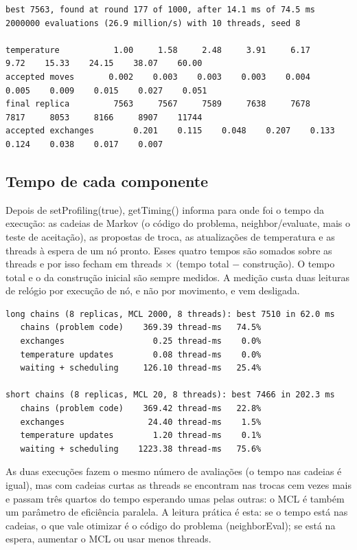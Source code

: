 \documentclass[10pt,a4paper]{article}
\newcommand{\code}[1]{{\ttfamily #1}}
\begin{document}
\begin{lstlisting}[style=saida]
best 7563, found at round 177 of 1000, after 14.1 ms of 74.5 ms
2000000 evaluations (26.9 million/s) with 10 threads, seed 8

temperature           1.00     1.58     2.48     3.91     6.17     9.72    15.33    24.15    38.07    60.00
accepted moves       0.002    0.003    0.003    0.003    0.004    0.005    0.009    0.015    0.027    0.051
final replica         7563     7567     7589     7638     7678     7817     8053     8166     8907    11744
accepted exchanges        0.201    0.115    0.048    0.207    0.133    0.124    0.038    0.017    0.007
\end{lstlisting}

\subsection{Tempo de cada componente}

Depois de \code{setProfiling(true)}, \code{getTiming()} informa para onde foi o tempo da execução: as cadeias de Markov (o código do problema, \code{neighbor}/\code{evaluate}, mais o teste de aceitação), as propostas de troca, as atualizações de temperatura e as threads à espera de um nó pronto. Esses quatro tempos são somados sobre as threads e por isso fecham em threads $\times$ (tempo total $-$ construção). O tempo total e o da construção inicial são sempre medidos. A medição custa duas leituras de relógio por execução de nó, e não por movimento, e vem desligada.

\begin{lstlisting}[style=saida]
long chains (8 replicas, MCL 2000, 8 threads): best 7510 in 62.0 ms
   chains (problem code)    369.39 thread-ms   74.5%
   exchanges                  0.25 thread-ms    0.0%
   temperature updates        0.08 thread-ms    0.0%
   waiting + scheduling     126.10 thread-ms   25.4%

short chains (8 replicas, MCL 20, 8 threads): best 7466 in 202.3 ms
   chains (problem code)    369.42 thread-ms   22.8%
   exchanges                 24.40 thread-ms    1.5%
   temperature updates        1.20 thread-ms    0.1%
   waiting + scheduling    1223.38 thread-ms   75.6%
\end{lstlisting}

As duas execuções fazem o mesmo número de avaliações (o tempo nas cadeias é igual), mas com cadeias curtas as threads se encontram nas trocas cem vezes mais e passam três quartos do tempo esperando umas pelas outras: o MCL é também um parâmetro de eficiência paralela. A leitura prática é esta: se o tempo está nas cadeias, o que vale otimizar é o código do problema (\code{neighborEval}); se está na espera, aumentar o MCL ou usar menos threads.
\end{document}
